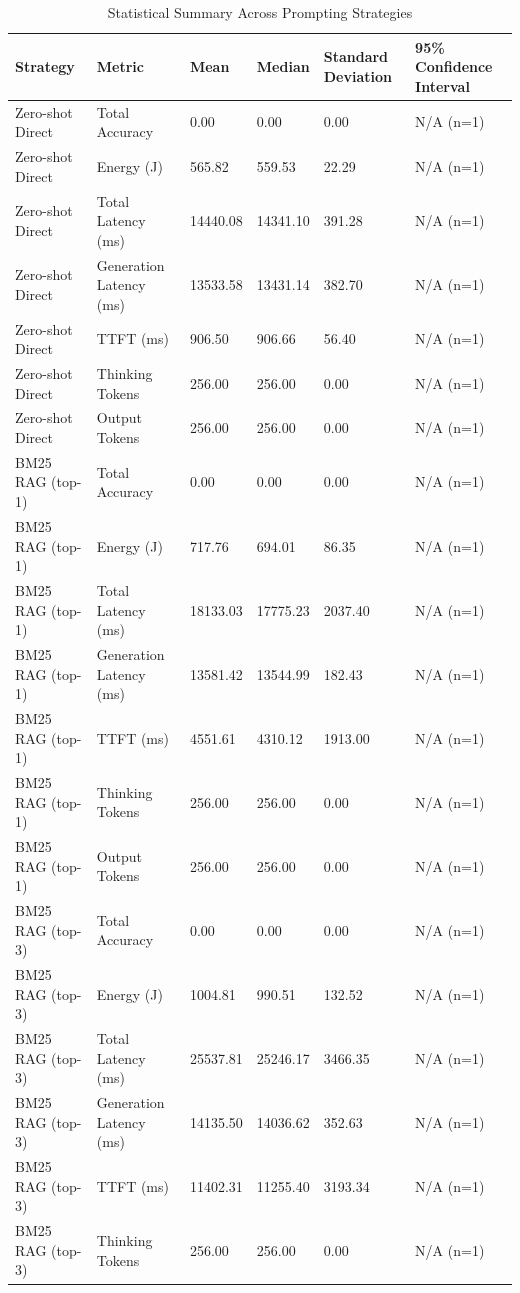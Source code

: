 \begin{table}
\caption{Statistical Summary Across Prompting Strategies}
\label{tab:statistical_summary}
\begin{tabular}{llllll}
\toprule
Strategy & Metric & Mean & Median & Standard Deviation & 95\% Confidence Interval \\
\midrule
Zero-shot Direct & Total Accuracy & 0.00 & 0.00 & 0.00 & N/A (n=1) \\
Zero-shot Direct & Energy (J) & 565.82 & 559.53 & 22.29 & N/A (n=1) \\
Zero-shot Direct & Total Latency (ms) & 14440.08 & 14341.10 & 391.28 & N/A (n=1) \\
Zero-shot Direct & Generation Latency (ms) & 13533.58 & 13431.14 & 382.70 & N/A (n=1) \\
Zero-shot Direct & TTFT (ms) & 906.50 & 906.66 & 56.40 & N/A (n=1) \\
Zero-shot Direct & Thinking Tokens & 256.00 & 256.00 & 0.00 & N/A (n=1) \\
Zero-shot Direct & Output Tokens & 256.00 & 256.00 & 0.00 & N/A (n=1) \\
BM25 RAG (top-1) & Total Accuracy & 0.00 & 0.00 & 0.00 & N/A (n=1) \\
BM25 RAG (top-1) & Energy (J) & 717.76 & 694.01 & 86.35 & N/A (n=1) \\
BM25 RAG (top-1) & Total Latency (ms) & 18133.03 & 17775.23 & 2037.40 & N/A (n=1) \\
BM25 RAG (top-1) & Generation Latency (ms) & 13581.42 & 13544.99 & 182.43 & N/A (n=1) \\
BM25 RAG (top-1) & TTFT (ms) & 4551.61 & 4310.12 & 1913.00 & N/A (n=1) \\
BM25 RAG (top-1) & Thinking Tokens & 256.00 & 256.00 & 0.00 & N/A (n=1) \\
BM25 RAG (top-1) & Output Tokens & 256.00 & 256.00 & 0.00 & N/A (n=1) \\
BM25 RAG (top-3) & Total Accuracy & 0.00 & 0.00 & 0.00 & N/A (n=1) \\
BM25 RAG (top-3) & Energy (J) & 1004.81 & 990.51 & 132.52 & N/A (n=1) \\
BM25 RAG (top-3) & Total Latency (ms) & 25537.81 & 25246.17 & 3466.35 & N/A (n=1) \\
BM25 RAG (top-3) & Generation Latency (ms) & 14135.50 & 14036.62 & 352.63 & N/A (n=1) \\
BM25 RAG (top-3) & TTFT (ms) & 11402.31 & 11255.40 & 3193.34 & N/A (n=1) \\
BM25 RAG (top-3) & Thinking Tokens & 256.00 & 256.00 & 0.00 & N/A (n=1) \\

\end{tabular}
\end{table}
